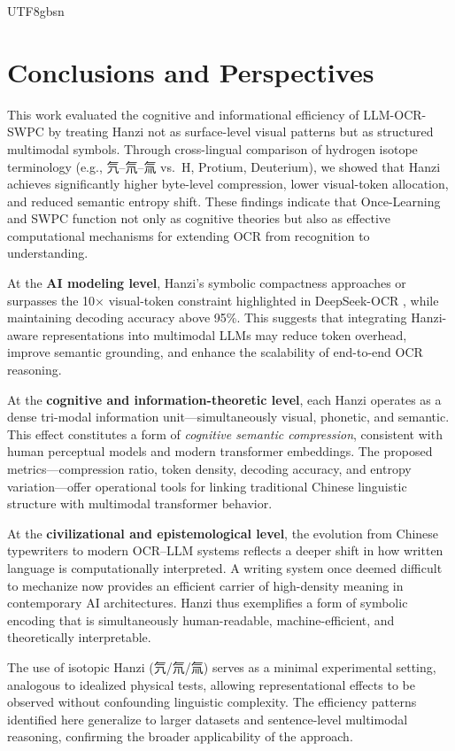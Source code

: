 \documentclass[conference]{IEEEtran}
\begin{document}
\begin{CJK*}{UTF8}{gbsn}
\section{Conclusions and Perspectives}
\label{sec:conclusion}

This work evaluated the cognitive and informational efficiency of LLM-OCR-SWPC by treating Hanzi not as surface-level visual patterns but as structured multimodal symbols. Through cross-lingual comparison of hydrogen isotope terminology (e.g., 氕–氘–氚 vs.\ H, Protium, Deuterium), we showed that Hanzi achieves significantly higher byte-level compression, lower visual-token allocation, and reduced semantic entropy shift. These findings indicate that Once-Learning \cite{weigang1999once} and SWPC \cite{weigang2024six} function not only as cognitive theories but also as effective computational mechanisms for extending OCR from recognition to understanding.

At the \textbf{AI modeling level}, Hanzi’s symbolic compactness approaches or surpasses the 10× visual-token constraint highlighted in DeepSeek-OCR \cite{wei2025deepseek}, while maintaining decoding accuracy above 95\%. This suggests that integrating Hanzi-aware representations into multimodal LLMs may reduce token overhead, improve semantic grounding, and enhance the scalability of end-to-end OCR reasoning.

At the \textbf{cognitive and information-theoretic level}, each Hanzi operates as a dense tri-modal information unit—simultaneously visual, phonetic, and semantic. This effect constitutes a form of \emph{cognitive semantic compression}, consistent with human perceptual models and modern transformer embeddings. The proposed metrics—compression ratio, token density, decoding accuracy, and entropy variation—offer operational tools for linking traditional Chinese linguistic structure with multimodal transformer behavior.

At the \textbf{civilizational and epistemological level}, the evolution from Chinese typewriters to modern OCR–LLM systems reflects a deeper shift in how written language is computationally interpreted. A writing system once deemed difficult to mechanize now provides an efficient carrier of high-density meaning in contemporary AI architectures. Hanzi thus exemplifies a form of symbolic encoding that is simultaneously human-readable, machine-efficient, and theoretically interpretable.

The use of isotopic Hanzi (氕/氘/氚) serves as a minimal experimental setting, analogous to idealized physical tests, allowing representational effects to be observed without confounding linguistic complexity. The efficiency patterns identified here generalize to larger datasets and sentence-level multimodal reasoning, confirming the broader applicability of the approach.


\end{CJK*}
\end{document}
